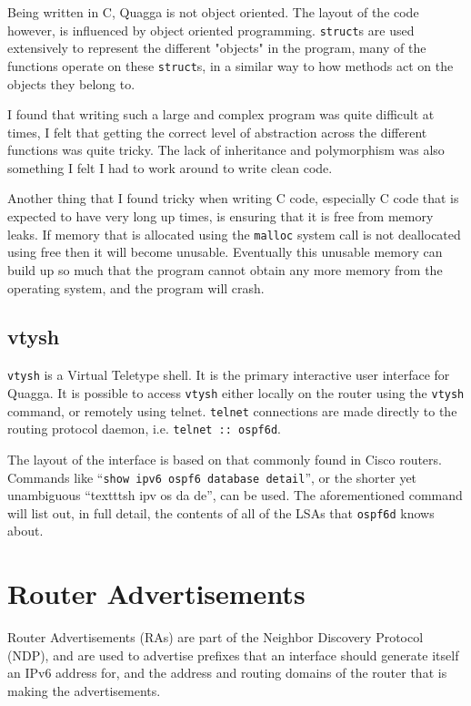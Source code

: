 \documentclass[12pt]{report}
\begin{document}
Being written in C, Quagga is not object oriented. The layout of the code 
however, is influenced by object oriented programming. \texttt{struct}s are used 
extensively to represent the different "objects" in the program, many of the 
functions operate on these \texttt{struct}s, in a similar way to how methods act on the 
objects they belong to.

I found that writing such a large and complex program was quite difficult at 
times, I felt that getting the correct level of abstraction across the different 
functions was quite tricky. The lack of inheritance and polymorphism was also 
something I felt I had to work around to write clean code. 

Another thing that I found tricky when writing C code, especially C code that
is expected to have very long up times, is ensuring that it is free from memory
leaks.  If memory that is allocated using the \texttt{malloc} system call is
not deallocated using free then it will become unusable. Eventually this
unusable memory can build up so much that the program cannot obtain any more
memory from the operating system, and the program will crash.


\subsection{vtysh}
\texttt{vtysh}  is a Virtual 
Teletype shell. It is the primary interactive user interface for Quagga. It is 
possible to access \texttt{vtysh} either locally on the router using the \texttt{vtysh} command, 
or remotely using telnet. \texttt{telnet} connections are made directly to the routing 
protocol daemon, i.e. \texttt{telnet :: ospf6d}.  

The layout of the interface is based on that commonly found in Cisco routers.
Commands like ``\texttt{show ipv6 ospf6 database detail}'', or the shorter yet
unambiguous ``texttt{sh ipv os da de}'', can be used. The aforementioned
command will list out, in full detail, the contents of all of the LSAs that
\texttt{ospf6d} knows about. 

\section{Router Advertisements}
Router Advertisements (RAs)  are part of
the Neighbor Discovery Protocol (NDP),  and are used to advertise prefixes that an interface should generate
itself an IPv6 address for, and the address and routing domains of the router
that is making the advertisements. 
\end{document}
